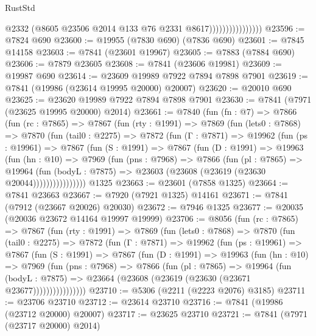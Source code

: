 \begin{lexlean}{RustStd}
\begin{coremodule}
{\begin{coremodule}
{{{{{{{{{{{{{{{{{{{{{{{{{{{{{{{{{{{{{{{{{{{{{{{{{{{{{{                                  @2332
                                  (@8605 @23506 @2014 @133 @76 @2331 @8617))))))))))))))))
@23596 := @7824 @690
@23600 := @19955 (@7830 @690) (@7836 @690)
@23601 := @7845 @14158
@23603 := @7841 (@23601 @19967)
@23605 := @7883 (@7884 @690)
@23606 := @7879 @23605
@23608 := @7841 (@23606 @19981)
@23609 := @19987 @690
@23614 := @23609 @19989 @7922 @7894 @7898 @7901
@23619 := @7841 (@19986 (@23614 @19995 @20000) @20007)
@23620 := @20010 @690
@23625 := @23620 @19989 @7922 @7894 @7898 @7901
@23630 := @7841 (@7971 (@23625 @19995 @20000) @2014)
@23661 := @7840
    (fun (fn : @7) =>
    @7866
      (fun (rc : @7865) =>
      @7867
        (fun (rty : @1991) =>
        @7869
          (fun (lets0 : @7868) =>
          @7870
            (fun (tail0 : @2275) =>
            @7872
              (fun (Γ : @7871) =>
              @19962
                (fun (ps : @19961) =>
                @7867
                  (fun (S : @1991) =>
                  @7867
                    (fun (D : @1991) =>
                    @19963
                      (fun (hn : @10) =>
                      @7969
                        (fun (pns : @7968) =>
                        @7866
                          (fun (pl : @7865) =>
                          @19964
                            (fun (bodyL : @7875) =>
                            @23603 (@23608 (@23619 (@23630 @20044))))))))))))))))
    @1325
@23663 := @23601 (@7858 @1325)
@23664 := @7841 @23663
@23667 := @7920 (@7921 @1325) @14161
@23671 := @7841 (@7912 (@23667 @20026) @20030)
@23672 := @7946 @1325
@23677 := @20035 (@20036 @23672 @14164 @19997 @19999)
@23706 := @8056
    (fun (rc : @7865) =>
    @7867
      (fun (rty : @1991) =>
      @7869
        (fun (lets0 : @7868) =>
        @7870
          (fun (tail0 : @2275) =>
          @7872
            (fun (Γ : @7871) =>
            @19962
              (fun (ps : @19961) =>
              @7867
                (fun (S : @1991) =>
                @7867
                  (fun (D : @1991) =>
                  @19963
                    (fun (hn : @10) =>
                    @7969
                      (fun (pns : @7968) =>
                      @7866
                        (fun (pl : @7865) =>
                        @19964
                          (fun (bodyL : @7875) =>
                          @23664 (@23608 (@23619 (@23630 (@23671 @23677))))))))))))))))
@23710 := @5306 (@2211 (@2223 @2076) @3185)
@23711 := @23706 @23710
@23712 := @23614 @23710
@23716 := @7841 (@19986 (@23712 @20000) @20007)
@23717 := @23625 @23710
@23721 := @7841 (@7971 (@23717 @20000) @2014)
}}}}}}}}}}}}}}}}}}}}}}}}}}}}}}}}}}}}}}}}}}}}}}}}}}}}}}
\end{coremodule}}
\end{coremodule}
\end{lexlean}
